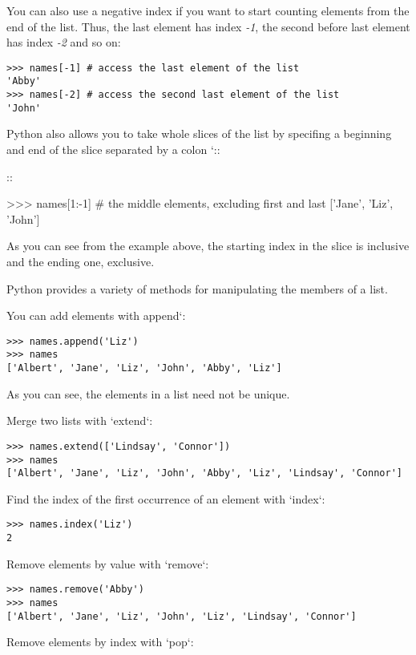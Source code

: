 You can also use a negative index if you want to start counting elements
from the end of the list. Thus, the last element has index \emph{-1},
the second before last element has index \emph{-2} and so on:

\begin{verbatim}
>>> names[-1] # access the last element of the list
'Abby'
>>> names[-2] # access the second last element of the list
'John'
\end{verbatim}

Python also allows you to take whole slices of the list by specifing a
beginning and end of the slice separated by a colon `::

::

  \textgreater{}\textgreater{}\textgreater{} names{[}1:-1{]} \# the middle elements, excluding first and last
  {[}'Jane', 'Liz', 'John'{]}

As you can see from the example above, the starting index in the slice
is inclusive and the ending one, exclusive.

Python provides a variety of methods for manipulating the members of a
list.

You can add elements with append`:

\begin{verbatim}
>>> names.append('Liz')
>>> names
['Albert', 'Jane', 'Liz', 'John', 'Abby', 'Liz']
\end{verbatim}

As you can see, the elements in a list need not be unique.

Merge two lists with `extend`:

\begin{verbatim}
>>> names.extend(['Lindsay', 'Connor'])
>>> names
['Albert', 'Jane', 'Liz', 'John', 'Abby', 'Liz', 'Lindsay', 'Connor']
\end{verbatim}

Find the index of the first occurrence of an element with `index`:

\begin{verbatim}
>>> names.index('Liz')
2
\end{verbatim}

Remove elements by value with `remove`:

\begin{verbatim}
>>> names.remove('Abby')
>>> names
['Albert', 'Jane', 'Liz', 'John', 'Liz', 'Lindsay', 'Connor']
\end{verbatim}

Remove elements by index with `pop`:

